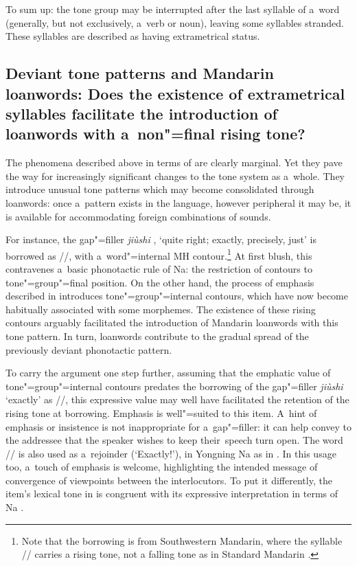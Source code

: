 To sum up: the tone group may be interrupted after the last syllable of
a~word (generally, but not exclusively, a~verb or noun), leaving some syllables stranded. These syllables are described as having
extrametrical status.


\subsection[Deviant tone patterns and Mandarin loanwords]{Deviant tone patterns and Mandarin loanwords: Does the existence of extrametrical syllables facilitate the introduction of loanwords with a~non"=final rising tone?}
\label{sec:extrametricalconsolidates}

The phenomena described above in terms of \textit{} are clearly marginal. Yet they pave the way for increasingly significant changes to the tone system as a~whole. They introduce unusual tone patterns which may become consolidated through loanwords: once a~pattern exists in the language, however peripheral it may be, it is available for accommodating foreign combinations of sounds. 

\newpage 
For instance, the
gap"=filler \textit{jiùshi} , ‘quite right; exactly, precisely, just’ is borrowed as
//, with a~word"=internal MH contour.\footnote{Note that the borrowing is from Southwestern Mandarin, where the syllable //  carries a rising tone, not a falling tone as in Standard Mandarin \citep[on Southwestern Mandarin:][]{guiyunnanese2001, pinson2008}.} At first blush, this contravenes a~basic phonotactic rule of Na: the restriction of contours to tone"=group"=final position. On the other hand, the process of emphasis described in  introduces tone"=group"=internal contours, which have now become habitually associated with some morphemes. The existence of these rising contours arguably facilitated the introduction of {Mandarin} loanwords with this tone pattern. In turn, loanwords contribute to the gradual spread of the previously deviant phonotactic pattern.

To carry the argument one step further, assuming that the emphatic value of tone"=group"=internal contours predates the borrowing of the gap"=filler \textit{jiùshi}  ‘exactly’ as //, this expressive value may well have facilitated the retention of the rising tone at borrowing. Emphasis is well"=suited to this item. A~hint of emphasis or insistence is not inappropriate for a~gap"=filler: it can help convey to the addressee that the speaker wishes to keep their~speech turn open. The word // is also used as a~rejoinder (‘Exactly!’), in Yongning Na as in . In this usage too, a~touch of emphasis is welcome, highlighting the intended message of convergence of viewpoints between the interlocutors. To put it differently, the item's lexical tone in  is congruent with its expressive interpretation in terms of Na .

